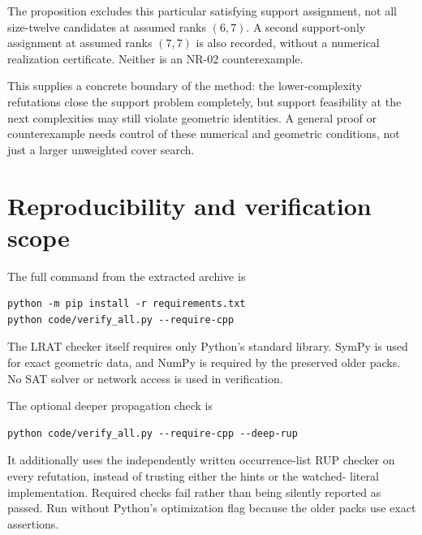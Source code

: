 \documentclass[11pt,a4paper]{article}
\theoremstyle{definition}\newtheorem{definition}[theorem]{Definition}
\theoremstyle{remark}\newtheorem{remark}[theorem]{Remark}
\begin{document}
The proposition excludes this particular satisfying support assignment, not
all size-twelve candidates at assumed ranks $(6,7)$. A second support-only
assignment at assumed ranks $(7,7)$ is also recorded, without a numerical
realization certificate. Neither is an NR-02 counterexample.

This supplies a concrete boundary of the method: the lower-complexity
refutations close the support problem completely, but support feasibility at
the next complexities may still violate geometric identities. A general proof
or counterexample needs control of these numerical and geometric conditions,
not just a larger unweighted cover search.

\section{Reproducibility and verification scope}\label{sec:verification}
The full command from the extracted archive is
\begin{verbatim}
python -m pip install -r requirements.txt
python code/verify_all.py --require-cpp
\end{verbatim}
The LRAT checker itself requires only Python's standard library. SymPy is
used for exact geometric data, and NumPy is required by the preserved older
packs. No SAT solver or network access is used in verification.

The optional deeper propagation check is
\begin{verbatim}
python code/verify_all.py --require-cpp --deep-rup
\end{verbatim}
It additionally uses the independently written occurrence-list RUP checker
on every refutation, instead of trusting either the hints or the watched-
literal implementation. Required checks fail rather than being silently
reported as passed. Run without Python's optimization flag because the older
packs use exact assertions.
\end{document}
